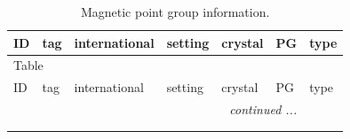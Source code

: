 \documentclass[fleqn,10pt]{jsarticle}
\begin{document}
\setcounter{MaxMatrixCols}{32}

\renewcommand{\tablename}{Table~}
\renewcommand{\figurename}{Figure~}
\begin{center}
\renewcommand{\arraystretch}{1.0}
\begin{longtable}{lllllll}
\caption{Magnetic point group information.}
 \\
 \hline \hline
ID & tag & international & setting & crystal & PG & type \\ \hline \endfirsthead

\multicolumn{6}{l}{\tablename\ \thetable{}} \\
 \hline \hline
ID & tag & international & setting & crystal & PG & type \\ \hline \endhead

 \hline \hline
\multicolumn{6}{r}{\footnotesize\it continued ...} \\ \endfoot

 \hline \hline
\multicolumn{6}{r}{} \\ \endlastfoot


\end{longtable}
\end{center}
\end{document}
